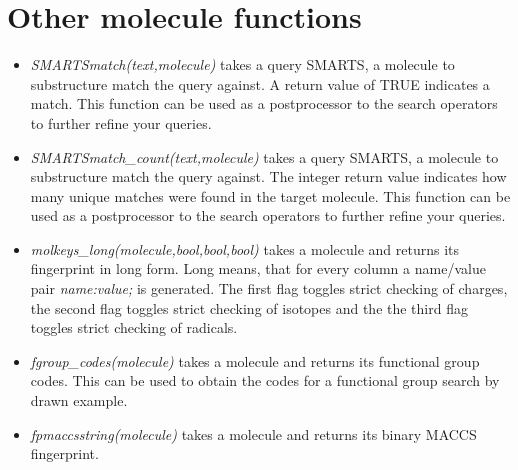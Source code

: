 \documentclass[a4paper]{article}
\begin{document}
\section{Other molecule functions}
\begin{itemize}
\item\textit{SMARTSmatch(text,molecule)} takes a query SMARTS, a molecule to substructure match the query against. A return value of TRUE indicates a match. This function can be used as a postprocessor to the search operators to further refine your queries.
\item\textit{SMARTSmatch\_count(text,molecule)} takes a query SMARTS, a molecule to substructure match the query against. The integer return value indicates how many unique matches were found in the target molecule. This function can be used as a postprocessor to the search operators to further refine your queries.
\item\textit{molkeys\_long(molecule,bool,bool,bool)} takes a molecule and returns its fingerprint in long form. Long means, that for every column a name/value pair \textit{name:value;} is generated. The first flag toggles strict checking of charges, the second flag toggles strict checking of isotopes and the the third flag toggles strict checking of radicals.
\item\textit{fgroup\_codes(molecule)} takes a molecule and returns its functional group codes. This can be used to obtain the codes for a functional group search by drawn example.
\item\textit{fpmaccsstring(molecule)} takes a molecule and returns its binary MACCS fingerprint.
\end{itemize}
\end{document}
